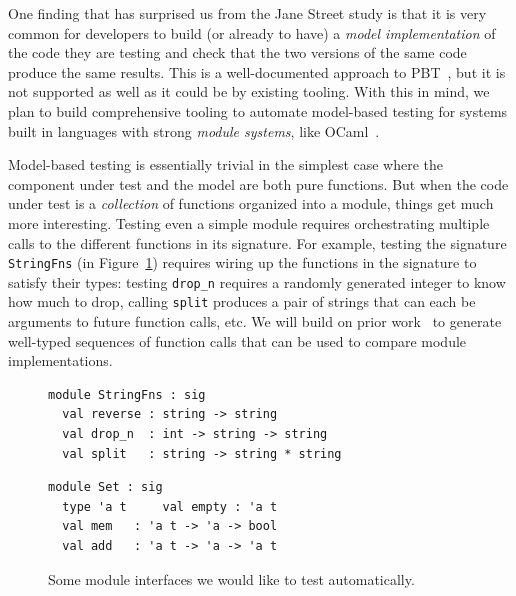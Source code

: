One finding that has surprised us from the Jane Street study is that
it is {very} common for developers to build (or already to have) a
{\em model
implementation} of the code they are testing and check that the two versions of
the same code produce the same results.  This is a well-documented approach to
PBT~\cite{hughes_experiences_2016}, but it is not supported as well as it could
be by existing tooling.
%
With this in mind, we plan to build comprehensive tooling to automate
model-based testing for systems built in languages with strong {\em
  module systems}, like OCaml~\cite{macqueen_modules_1984}.

Model-based testing is essentially trivial in the simplest case where
the component under test and the model are both pure functions.  But
when the code under test is a {\em
  collection} of functions
organized into a module, things get much more interesting. Testing even a simple
module requires orchestrating multiple calls to the different functions in
its signature. For example, testing the signature \lstinline{StringFns} (in
Figure~\ref{fig:sigs}) requires wiring up the functions in the
signature to satisfy their types: testing \lstinline{drop_n} requires a randomly generated
integer to know how much to drop, calling \lstinline{split} produces a pair of strings
that can each be arguments to future function calls, etc. We will build on prior
work~\cite{hughes_experiences_2016} to generate well-typed sequences of function
calls that can be used to compare module implementations.

\begin{figure}[h]
  \begin{minipage}{.45\textwidth}
\begin{lstlisting}
module StringFns : sig
  val reverse : string -> string
  val drop_n  : int -> string -> string
  val split   : string -> string * string
\end{lstlisting}
  \end{minipage}
  \qquad\qquad
  \begin{minipage}{.45\textwidth}
\begin{lstlisting}
module Set : sig
  type 'a t     val empty : 'a t
  val mem   : 'a t -> 'a -> bool
  val add   : 'a t -> 'a -> 'a t
\end{lstlisting}
  \end{minipage}
  \vspace{-2mm}
  \caption{Some module interfaces we would like to test
    automatically.}\label{fig:sigs}
\end{figure}

